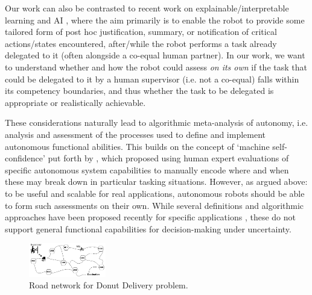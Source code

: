 Our work can also be contrasted to recent work on explainable/interpretable learning and AI \cite{Huang2018-ab,Lipton2016-ug,Ribeiro2016-uc,Guidotti2018-pi}, where the aim primarily is to enable the robot to provide some tailored form of post hoc justification, summary, or notification of critical actions/states encountered, after/while the robot performs a task already delegated to it (often alongside a co-equal human partner). In our work, we want to understand whether and how the robot could assess \emph{on its own} if the task that could be delegated to it by a human supervisor (i.e. not a co-equal) falls within its competency boundaries, and thus whether the task to be delegated is appropriate or realistically achievable. %

These considerations naturally lead to algorithmic meta-analysis of autonomy, i.e. analysis and assessment of the processes used to define and implement autonomous functional abilities. This builds on the concept of `machine self-confidence' put forth by \cite{Hutchins2015-if}, which proposed using human expert evaluations of specific autonomous system capabilities to manually encode where and when these may break down in particular tasking situations. However, as argued above: to be useful and scalable for real applications, autonomous robots should be able to form such assessments on their own. While several definitions and algorithmic approaches have been proposed recently for specific applications \cite{ Kuter2015-qh,Sweet2016-tz,  Zagorecki2015-qy}, these do not support general functional capabilities for decision-making under uncertainty. 
%


\begin{figure}[t]%
    	\centering
     	\includegraphics[width=0.3\textwidth]{Figures/RoadNet}
    	\caption{Road network for Donut Delivery problem.} 
        \label{fig:RoadNet}
        \vspace{-0.5cm}
\end{figure}    


